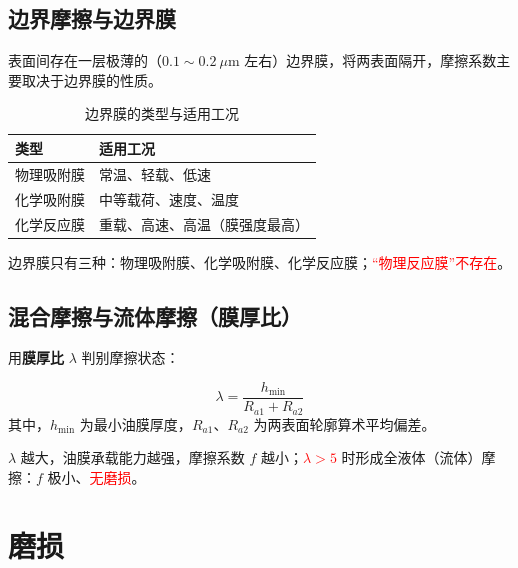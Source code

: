 \subsection{边界摩擦与边界膜}

表面间存在一层极薄的（$0.1\sim0.2\ \mu\mathrm{m}$ 左右）边界膜，将两表面隔开，摩擦系数主要取决于边界膜的性质。

\begin{definition}[边界膜的类型]
\label{def:边界膜}
\begin{table}[H]
\centering
\caption{边界膜的类型与适用工况}
\label{tab:摩擦:边界膜}
\begin{tabular}{ll}
	\toprule
	类型 & 适用工况 \\
	\midrule
	物理吸附膜 & 常温、轻载、低速 \\
	化学吸附膜 & 中等载荷、速度、温度 \\
	化学反应膜 & 重载、高速、高温（膜强度最高） \\
	\bottomrule
\end{tabular}
\end{table}
\end{definition}

\begin{note}
边界膜只有三种：物理吸附膜、化学吸附膜、化学反应膜；\textcolor{red}{“物理反应膜”不存在}。
\end{note}

\subsection{混合摩擦与流体摩擦（膜厚比）}

用\textbf{膜厚比} $\lambda$ 判别摩擦状态：

\begin{theorem}[膜厚比]
\label{thm:膜厚比}
\begin{equation}
	\lambda=\frac{h_{\min}}{R_{a1}+R_{a2}}
	\label{eq:摩擦:膜厚比}
\end{equation}
其中，$h_{\min}$ 为最小油膜厚度，$R_{a1}$、$R_{a2}$ 为两表面轮廓算术平均偏差。

$\lambda$ 越大，油膜承载能力越强，摩擦系数 $f$ 越小；\textcolor{red}{$\lambda>5$} 时形成全液体（流体）摩擦：$f$ 极小、\textcolor{red}{无磨损}。
\end{theorem}

\section{磨损}
\label{sec:磨损}

